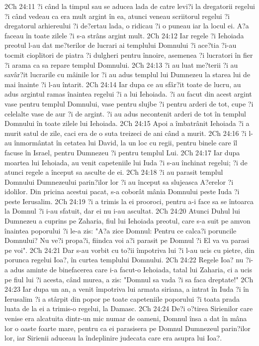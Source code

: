 2Ch 24:11  ?i când la timpul sau se aducea lada de catre levi?i la dregatorii regelui ?i când vedeau ca era mult argint în ea, atunci veneau scriitorul regelui ?i dregatorul arhiereului ?i de?ertau lada, o ridicau ?i o puneau iar la locul ei. A?a faceau în toate zilele ?i s-a strâns argint mult.
2Ch 24:12  Iar regele ?i Iehoiada preotul l-au dat me?terilor de lucrari ai templului Domnului ?i ace?tia ?i-au tocmit cioplitori de piatra ?i dulgheri pentru înnoire, asemenea ?i lucratori în fier ?i arama ca sa repare templul Domnului.
2Ch 24:13  ?i au luat me?terii ?i au savâr?it lucrarile cu mâinile lor ?i au adus templul lui Dumnezeu la starea lui de mai înainte ?i l-au întarit.
2Ch 24:14  Iar dupa ce au sfâr?it toate de lucru, au adus argintul ramas înaintea regelui ?i a lui Iehoiada. ?i au facut din acest argint vase pentru templul Domnului, vase pentru slujbe ?i pentru arderi de tot, cupe ?i celelalte vase de aur ?i de argint. ?i au adus necontenit arderi de tot în templul Domnului în toate zilele lui Iehoiada.
2Ch 24:15  Apoi a îmbatrânit Iehoiada ?i a murit satul de zile, caci era de o suta treizeci de ani când a murit.
2Ch 24:16  ?i l-au înmormântat în cetatea lui David, la un loc cu regii, pentru binele care îl facuse în Israel, pentru Dumnezeu ?i pentru templul Lui.
2Ch 24:17  Iar dupa moartea lui Iehoiada, au venit capeteniile lui Iuda ?i s-au închinat regelui; ?i de atunci regele a început sa asculte de ei.
2Ch 24:18  ?i au parasit templul Domnului Dumnezeului parin?ilor lor ?i au început sa slujeasca A?erelor ?i idolilor. Din pricina acestui pacat, s-a coborât mânia Domnului peste Iuda ?i peste Ierusalim.
2Ch 24:19  ?i a trimis la ei prooroci, pentru a-i face sa se întoarca la Domnul ?i i-au sfatuit, dar ei nu i-au ascultat.
2Ch 24:20  Atunci Duhul lui Dumnezeu a cuprins pe Zaharia, fiul lui Iehoiada preotul, care s-a suit pe amvon înaintea poporului ?i le-a zis: "A?a zice Domnul: Pentru ce calca?i poruncile Domnului? Nu ve?i propa?i, fiindca voi a?i parasit pe Domnul ?i El va va parasi pe voi".
2Ch 24:21  Dar s-au vorbit cu to?ii împotriva lui ?i l-au ucis cu pietre, din porunca regelui Ioa?, în curtea templului Domnului.
2Ch 24:22  Regele Ioa? nu ?i-a adus aminte de binefacerea care i-a facut-o Iehoiada, tatal lui Zaharia, ci a ucis pe fiul lui ?i acesta, când murea, a zis: "Domnul sa vada ?i sa faca dreptate!"
2Ch 24:23  Iar dupa un an, a venit împotriva lui armata siriana, a intrat în Iuda ?i în Ierusalim ?i a stârpit din popor pe toate capeteniile poporului ?i toata prada luata de la ei a trimis-o regelui, la Damasc.
2Ch 24:24  De?i o?tirea Sirienilor care venise era alcatuita dintr-un mic numar de oameni, Domnul însa a dat în mâna lor o oaste foarte mare, pentru ca ei parasisera pe Domnul Dumnezeul parin?ilor lor, iar Sirienii aduceau la îndeplinire judecata care era asupra lui Ioa?.
